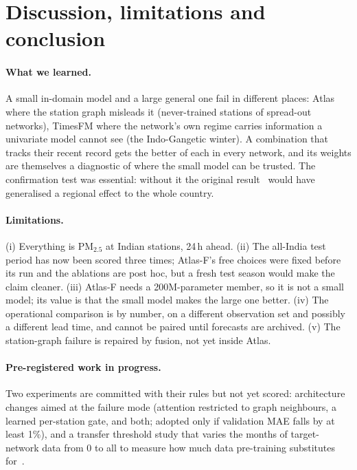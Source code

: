 \documentclass{article}
\newcommand{\pmtf}{PM$_{2.5}$}
\begin{document}
\section{Discussion, limitations and conclusion}
\label{sec:conclusion}

\paragraph{What we learned.} A small in-domain model and a large general one fail in different places: Atlas where the
station graph misleads it (never-trained stations of spread-out networks), TimesFM where the network's own regime
carries information a univariate model cannot see (the Indo-Gangetic winter). A combination that tracks their recent
record gets the better of each in every network, and its weights are themselves a diagnostic of where the small model
can be trusted. The confirmation test was essential: without it the original result~\citep{atlas1} would have generalised a
regional effect to the whole country.

\paragraph{Limitations.} (i) Everything is \pmtf{} at Indian stations, 24\,h ahead. (ii) The all-India test period has
now been scored three times; Atlas-F's free choices were fixed before its run and the ablations are post hoc, but a fresh
test season would make the claim cleaner. (iii) Atlas-F needs a 200M-parameter member, so it is not a small model; its
value is that the small model makes the large one better. (iv) The operational comparison is by number, on a different
observation set and possibly a different lead time, and cannot be paired until forecasts are archived. (v) The
station-graph failure is repaired by fusion, not yet inside Atlas.

\paragraph{Pre-registered work in progress.} Two experiments are committed with their rules but not yet scored:
architecture changes aimed at the failure mode (attention restricted to graph neighbours, a learned per-station gate, and
both; adopted only if validation MAE falls by at least 1\%), and a transfer threshold study that varies the months of
target-network data from 0 to all to measure how much data pre-training substitutes for~\citep{hernandez2021scaling}.
\end{document}

